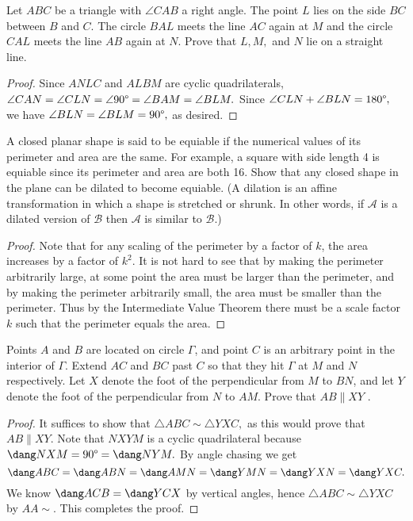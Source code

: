 \documentclass[letterpaper,oneside]{scrartcl}
\begin{document}
\begin{problem*}
  Let $ABC$ be a triangle with $\angle CAB$ a right angle. The point $L$ lies on the side $BC$ between $B$ and $C$. The circle $BAL$ meets the line $AC$ again at $M$ and the circle $CAL$ meets the line $AB$ again at $N.$ Prove that $L, M,$ and $N$ lie on a straight line.
\end{problem*}
\begin{proof}
  Since $ANLC$ and $ALBM$ are cyclic quadrilaterals, $\angle CAN = \angle CLN = \angle 90\degree = \angle BAM = \angle BLM.$ Since $\angle CLN + \angle BLN = 180\degree,$ we have $\angle BLN = \angle BLM = 90\degree,$ as desired.
\end{proof}
\begin{problem*}
  A closed planar shape is said to be equiable if the numerical values of its perimeter and area are the same. For example, a square with side length 4 is equiable since its perimeter and area are both 16. Show that any closed shape in the plane can be dilated to become equiable. (A dilation is an affine transformation in which a shape is stretched or shrunk. In other words, if $\mathcal{A}$ is a dilated version of $\mathcal{B}$ then $\mathcal{A}$ is similar to $\mathcal{B}$.)
\end{problem*}
\begin{proof}
  Note that for any scaling of the perimeter by a factor of $k$, the area increases by a factor of $k^2.$ It is not hard to see that by making the perimeter arbitrarily large, at some point the area must be larger than the perimeter, and by making the perimeter arbitrarily small, the area must be smaller than the perimeter. Thus by the Intermediate Value Theorem there must be a scale factor $k$ such that the perimeter equals the area.
\end{proof}
\begin{problem*}
  Points $A$ and $B$ are located on circle $\Gamma$, and point $C$ is an arbitrary point in the interior of $\Gamma$. Extend $AC$ and $BC$ past $C$ so that they hit $\Gamma$ at $M$ and $N$ respectively. Let $X$ denote the foot of the perpendicular from $M$ to $BN$, and let $Y$ denote the foot of the perpendicular from $N$ to $AM$. Prove that $AB \parallel XY$ .
\end{problem*}
\begin{proof}
  It suffices to show that $\triangle ABC \sim \triangle YXC,$ as this would prove that $AB \parallel XY.$ Note that $NXYM$ is a cyclic quadrilateral because $\dang NXM = 90\degree = \dang NYM.$ By angle chasing we get
  $$\dang ABC = \dang ABN = \dang AMN  = \dang YMN = \dang YXN = \dang YXC.$$
  We know $\dang ACB = \dang YCX$ by vertical angles, hence $\triangle ABC \sim \triangle YXC$ by $AA\sim.$ This completes the proof.
\end{proof}
\end{document}
